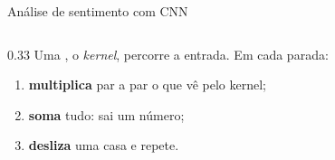\begin{frame}{Análise de sentimento com CNN}
    \begin{columns}[c]
        \begin{column}{0.33\textwidth}
            \footnotesize
            Uma , o \textit{kernel}, percorre a entrada. Em cada parada:

            \vspace{0.1cm}
            \begin{enumerate}\setlength{\itemsep}{2pt}
                \item \textbf{multiplica} par a par o que vê pelo kernel;
                \item \textbf{soma} tudo: sai um número;
                \item \textbf{desliza} uma casa e repete.
            \end{enumerate}


\end{column}
\end{columns}
\end{frame}
